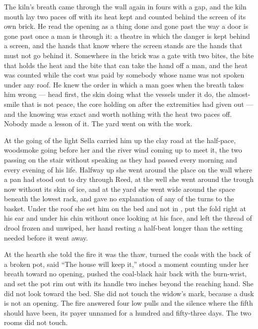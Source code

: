 The kiln's breath came through the wall again in fours with a gap, and the kiln mouth lay two paces off with its heat kept and counted behind the screen of its own brick. He read the opening as a thing done and gone past the way a door is gone past once a man is through it: a theatre in which the danger is kept behind a screen, and the hands that know where the screen stands are the hands that must not go behind it. Somewhere in the brick was a gate with two bites, the bite that holds the heat and the bite that can take the hand off a man, and the heat was counted while the cost was paid by somebody whose name was not spoken under any roof. He knew the order in which a man goes when the breath takes him wrong --- head first, the skin doing what the vessels under it do, the almost-smile that is not peace, the core holding on after the extremities had given out --- and the knowing was exact and worth nothing with the heat two paces off. Nobody made a lesson of it. The yard went on with the work.

\scenebreak

At the going of the light Sella carried him up the clay road at the half-pace, woodsmoke going before her and the river wind coming up to meet it, the two passing on the stair without speaking as they had passed every morning and every evening of his life. Halfway up she went around the place on the wall where a pan had stood out to dry through Reed, at the well she went around the trough now without its skin of ice, and at the yard she went wide around the space beneath the lowest rack, and gave no explanation of any of the turns to the basket. Under the roof she set him on the bed and not in , put the fold right at his ear and under his chin without once looking at his face, and left the thread of drool frozen and unwiped, her hand resting a half-beat longer than the setting needed before it went away.

At the hearth she told the fire it was the thaw, turned the coals with the back of a broken pot, said “The house will keep it,” stood a moment counting under her breath toward no opening, pushed the coal-black hair back with the burn-wrist, and set the pot rim out with its handle two inches beyond the reaching hand. She did not look toward the bed. She did not touch the widow's mark, because a dusk is not an opening. The fire answered four low pulls and the silence where the fifth should have been, its payer unnamed for a hundred and fifty-three days. The two rooms did not touch.

